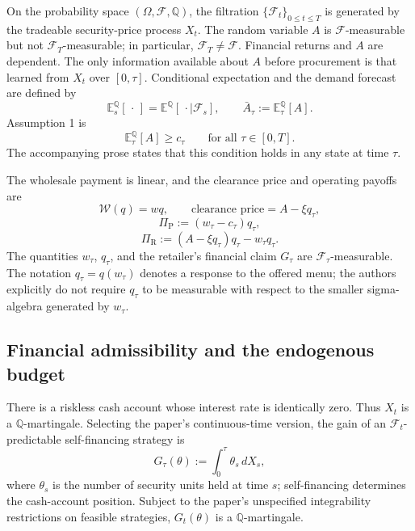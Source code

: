 \documentclass{article}
\begin{document}
On the probability space $(\Omega,\mathscr F,\mathbb Q)$, the filtration
$\{\mathscr F_t\}_{0\leqslant t\leqslant T}$ is generated by the tradeable
security-price process $X_t$. The random variable $A$ is
$\mathscr F$-measurable but not $\mathscr F_T$-measurable; in particular,
$\mathscr F_T\ne\mathscr F$. Financial returns and $A$ are dependent.
The only information available about $A$ before procurement is that
learned from $X_t$ over $[0,\tau]$. Conditional expectation and the demand
forecast are defined by
\[
\mathbb E_s^{\mathbb Q}[\,\cdot\,]
=\mathbb E^{\mathbb Q}[\,\cdot\mid\mathscr F_s],
\qquad
\bar A_\tau:=\mathbb E_\tau^{\mathbb Q}[A].
\]
Assumption 1 is
\[
\mathbb E_\tau^{\mathbb Q}[A]\geqslant c_\tau
\qquad\text{for all }\tau\in[0,T].
\]
The accompanying prose states that this condition holds in any state
at time $\tau$.

The wholesale payment is linear, and the clearance price and operating
payoffs are
\[
\mathscr W(q)=wq,
\qquad\text{clearance price}=A-\xi q_\tau,
\]
\begin{equation}
\Pi_{\mathrm P}:=(w_\tau-c_\tau)q_\tau,
\tag{1}
\end{equation}
\begin{equation}
\Pi_{\mathrm R}:=(A-\xi q_\tau)q_\tau-w_\tau q_\tau.
\tag{2}
\end{equation}
The quantities $w_\tau$, $q_\tau$, and the retailer's financial claim
$G_\tau$ are $\mathscr F_\tau$-measurable. The notation
$q_\tau=q(w_\tau)$ denotes a response to the offered menu; the authors
explicitly do not require $q_\tau$ to be measurable with respect to the
smaller sigma-algebra generated by $w_\tau$.

\subsection*{Financial admissibility and the endogenous budget}

There is a riskless cash account whose interest rate is identically
zero. Thus $X_t$ is a $\mathbb Q$-martingale. Selecting the paper's
continuous-time version, the gain of an
$\mathscr F_t$-predictable self-financing strategy is
\begin{equation}
G_\tau(\theta):=\int_0^\tau\theta_s\,dX_s,
\tag{3}
\end{equation}
where $\theta_s$ is the number of security units held at time $s$;
self-financing determines the cash-account position. Subject to the
paper's unspecified integrability restrictions on feasible strategies,
$G_t(\theta)$ is a $\mathbb Q$-martingale.
\end{document}
